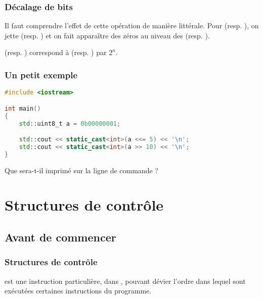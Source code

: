 \documentclass{cppcourses}
\begin{document}
\begin{frame}

\frametitle{Décalage de bits}

Il faut comprendre l'effet de cette opération de manière littérale. Pour  (resp. ), on jette  (resp. ) et on fait apparaître des zéros au niveau des  (resp. ).

\begin{remark}
 (resp. ) correspond à  (resp. ) par \( 2^n \).
\end{remark}

\end{frame}

\begin{frame}[fragile]

\frametitle{Un petit exemple}

\begin{example}

\begin{lstlisting}[language = c++]
#include <iostream>

int main()
{
    std::uint8_t a = 0b00000001;

    std::cout << static_cast<int>(a <<= 5) << '\n';
    std::cout << static_cast<int>(a >> 10) << '\n';
}
\end{lstlisting}

Que sera-t-il imprimé sur la ligne de commande ?


\end{example}

\end{frame}

\section{Structures de contrôle}

\subsection{Avant de commencer}

\begin{frame}

\frametitle{Structures de contrôle}

\begin{definition}
 est une instruction particulière, dans , pouvant dévier l'ordre dans lequel sont exécutées certaines instructions du programme.
\end{definition}

\end{frame}
\end{document}
